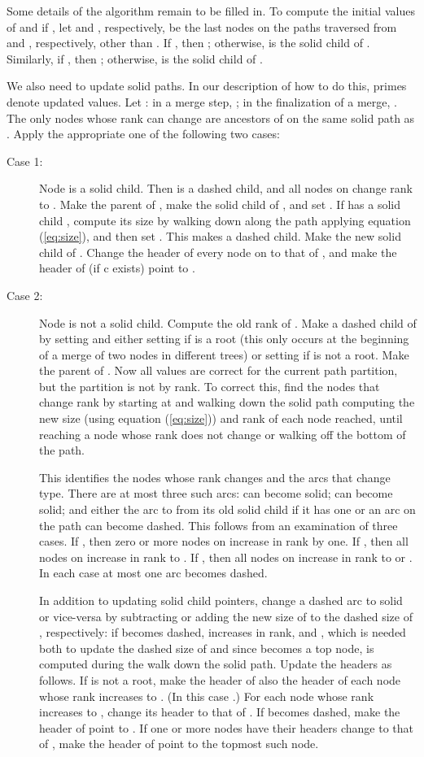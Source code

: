 \documentclass[twoside,leqno,twocolumn]{article}
\begin{document}
Some details of the algorithm remain to be filled in.  To compute the initial values of  and  if , let  and , respectively, be the last nodes on the paths traversed from  and , respectively, other than . If , then ; otherwise,  is the solid child of .  Similarly, if , then ; otherwise,  is the solid child of .


We also need to update solid paths.  In our description of how to do this, primes denote updated values.  Let : in a merge step, ; in the finalization of a merge, .  The only nodes whose rank can change are ancestors of  on the same solid path as .  Apply the appropriate one of the following two cases:

\begin{description}
\item[Case 1:] Node  is a solid child.  Then  is a dashed child, and all nodes on  change rank to .  Make  the parent of , make  the solid child of , and set .  If  has a solid child , compute its size by walking down along the path  applying equation (\ref{eq:size}), and then set .  This makes  a dashed child.   Make  the new solid child of .  Change the header of every node on  to that of , and make the header of  (if c exists) point to . 

\item[Case 2:] Node  is not a solid child.  Compute the old rank of .   Make  a dashed child of  by setting  and either setting  if  is a root (this only occurs at the beginning of a merge of two nodes in different trees) or setting  if  is not a root.  Make  the parent of .  Now all values are correct for the current path partition, but the partition is not by rank.  To correct this, find the nodes that change rank by starting at  and walking down the solid path computing the new size (using equation (\ref{eq:size})) and rank of each node reached, until reaching a node whose rank does not change or walking off the bottom of the path.

    This identifies the nodes whose rank changes and the arcs that change type.  There are at most three such arcs:  can become solid;  can become solid; and either the arc to  from its old solid child if it has one or an arc on the path  can become dashed.  This follows from an examination of three cases.  If , then zero or more nodes on  increase in rank by one.  If , then all nodes on  increase in rank to .  If , then all nodes on  increase in rank to  or .  In each case at most one arc becomes dashed.

    In addition to updating solid child pointers, change a dashed arc  to solid or vice-versa by subtracting or adding the new size of  to the dashed size of , respectively: if  becomes dashed,  increases in rank, and , which is needed both to update the dashed size of  and since  becomes a top node, is computed during the walk down the solid path.  Update the headers as follows.  If  is not a root, make the header of  also the header of each node whose rank increases to .  (In this case .)  For each node whose rank increases to , change its header to that of .  If  becomes dashed, make the header of  point to .  If one or more nodes have their headers change to that of , make the header of  point to the topmost such node. \end{description}
\end{document}
